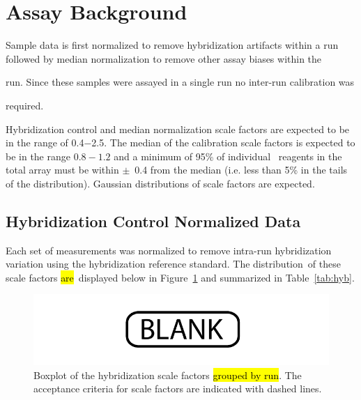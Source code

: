 \documentclass[11pt]{article}
\newif\ifcalibrated   %
\newif\ifincludeCalSop  %
\newif\ifuseLogScale  %
\newcommand{\Plural}{}
\newcommand{\IsAre}{\hl{are}}
\begin{document}
\section{Assay Background} \label{sec:background}
Sample data is first normalized to remove hybridization artifacts within a run
followed by median normalization to remove other assay biases within the 
\ifcalibrated
  run and finally calibrated to remove assay differences between runs. 
\else
  run. Since these samples were assayed in a single run no inter-run calibration was 
  \ifincludeCalSop
    required, though the calibration scale factors were examined to verify that
    the met the assay acceptance criteria.  
  \else
    required.
  \fi
\fi

Hybridization control and median normalization scale factors are expected to be
in the range of 0.4$-$2.5\ifuseLogScale ($\pm~1.32$ on log$_2$ scale)\fi. 
The median of the calibration scale factors is expected to be in the range
$0.8-1.2$ and a minimum of 95\% of individual \texttrademark~reagents in
the total array must be within $\pm$~0.4 from the median (i.e. less than 5\% in
the tails of the distribution). Gaussian distributions of scale factors are expected.


\subsection{Hybridization Control Normalized Data} \label{sec:hyb}
Each set of measurements was normalized to remove intra-run hybridization
variation using the hybridization reference standard. 
The distribution\Plural~of these scale factors \IsAre~displayed below in
Figure~\ref{fig:hyb_cdf} and summarized in Table~\ref{tab:hyb}.


\begin{figure}[H]
  \centering
  \includegraphics[height=.5\textwidth]{plots/hyb-norm.pdf}
  \caption{Boxplot of the hybridization scale factors \hl{grouped by run}. The
    acceptance criteria for scale factors are indicated with dashed lines.}
  \label{fig:hyb_cdf}
\end{figure}
\end{document}
